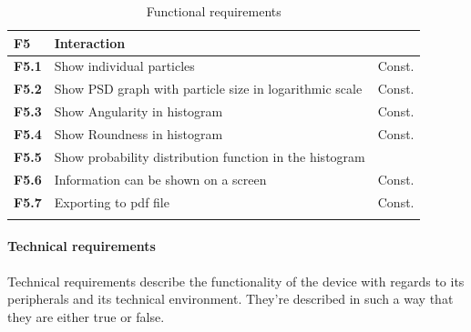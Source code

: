 \documentclass[11pt,fleqn,,a4paper,twoside,openright]{book}
\begin{document}
\begin{longtable}{|p{1cm}| p{10cm} p{1.5cm}|}
\textbf{F5}\label{F5} & \textbf{Interaction} &  \\ 
\hline 
\textbf{F5.1}\label{F5.1} & Show individual particles  & Const. \\ 
\hline 
\textbf{F5.2}\label{F5.2} & Show PSD graph with particle size in logarithmic scale  & Const.  \\ 
\hline 
\textbf{F5.3}\label{F5.3} & Show Angularity in histogram  & Const. \\ 
\hline 
\textbf{F5.4}\label{F5.4} & Show Roundness in histogram & Const. \\ 
\hline 
\textbf{F5.5}\label{F5.5} & Show probability distribution function in the histogram &  \\ 
\hline 
\textbf{F5.6}\label{F5.6} & Information can be shown on a screen & Const. \\
\hline 
\textbf{F5.7}\label{F5.7} & Exporting to pdf file & Const. \\
\hline 
\caption{Functional requirements}\label{tab:FuncReq}
\end{longtable} 

\newpage
\paragraph{Technical requirements}
Technical requirements describe the functionality of the device with regards to its peripherals and its technical environment. They're described in such a way that they are either true or false.
\end{document}
